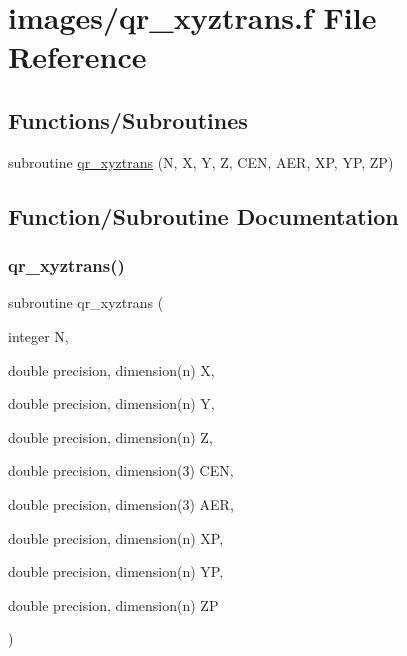 \hypertarget{qr__xyztrans_8f}{}\section{images/qr\+\_\+xyztrans.f File Reference}
\label{qr__xyztrans_8f}
\subsection*{Functions/\+Subroutines}
\begin{DoxyCompactItemize}
\item 
subroutine \hyperlink{qr__xyztrans_8f_a8b84b1d5c63115b9e38aa5ea4d8ae053}{qr\+\_\+xyztrans} (N, X, Y, Z, C\+EN, A\+ER, XP, YP, ZP)
\end{DoxyCompactItemize}


\subsection{Function/\+Subroutine Documentation}
\mbox{\label{qr__xyztrans_8f_a8b84b1d5c63115b9e38aa5ea4d8ae053}} 
\subsubsection{\texorpdfstring{qr\+\_\+xyztrans()}{qr\_xyztrans()}}
{\footnotesize\ttfamily subroutine qr\+\_\+xyztrans (\begin{DoxyParamCaption}\item[{integer}]{N,  }\item[{double precision, dimension(n)}]{X,  }\item[{double precision, dimension(n)}]{Y,  }\item[{double precision, dimension(n)}]{Z,  }\item[{double precision, dimension(3)}]{C\+EN,  }\item[{double precision, dimension(3)}]{A\+ER,  }\item[{double precision, dimension(n)}]{XP,  }\item[{double precision, dimension(n)}]{YP,  }\item[{double precision, dimension(n)}]{ZP }\end{DoxyParamCaption})}

